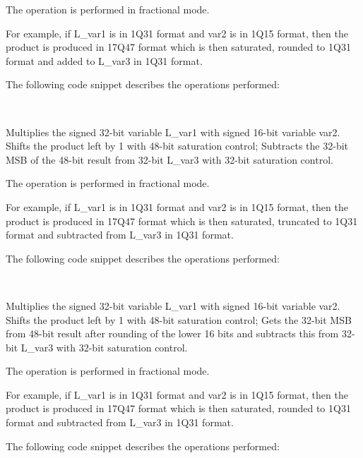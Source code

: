 The operation is performed in fractional mode.

For example, if L\_var1 is in 1Q31 format and var2 is in 1Q15 format, then the product is produced in 17Q47 format which is then saturated, rounded to 1Q31 format and added to L\_var3 in 1Q31 format.

The following code snippet describes the operations performed:

\\


Multiplies the signed 32-bit variable L\_var1 with signed 16-bit variable var2.
Shifts the product left by 1 with 48-bit saturation control; Subtracts the 32-bit MSB of the 48-bit result from 32-bit L\_var3 with 32-bit saturation control.

The operation is performed in fractional mode.

For example, if L\_var1 is in 1Q31 format and var2 is in 1Q15 format, then the product is produced in 17Q47 format which is then saturated, truncated to 1Q31 format and subtracted from L\_var3 in 1Q31 format.

The following code snippet describes the operations performed:

\\


Multiplies the signed 32-bit variable L\_var1 with signed 16-bit variable var2.
Shifts the product left by 1 with 48-bit saturation control; Gets the 32-bit MSB from 48-bit result after rounding of the lower 16 bits and subtracts this from 32-bit L\_var3 with 32-bit saturation control.

The operation is performed in fractional mode.

For example, if L\_var1 is in 1Q31 format and var2 is in 1Q15 format, then the product is produced in 17Q47 format which is then saturated, rounded to 1Q31 format and subtracted from L\_var3 in 1Q31 format.

The following code snippet describes the operations performed:

